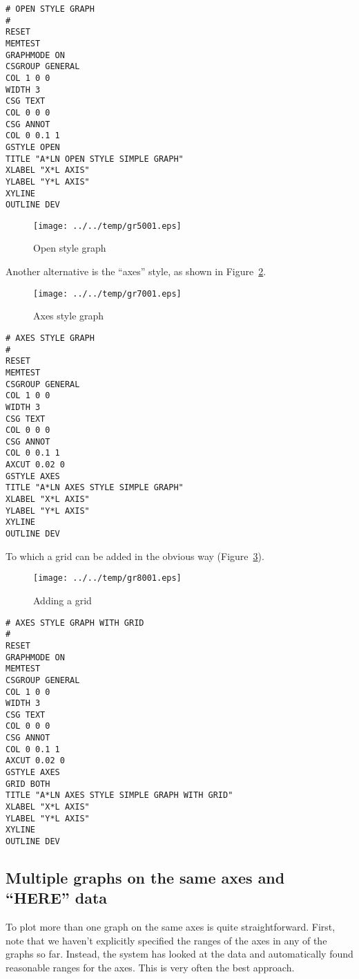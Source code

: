 \documentclass[a4paper,twoside,11pt]{article}
\makeatletter
\def\maxwidth{%
  \ifdim\Gin@nat@width>\linewidth
    \linewidth
  \else
    \Gin@nat@width
  \fi
}
\newcommand{\newpara}{\par\vspace{4mm}\noindent}
\makeatother
\begin{document}
\begin{lstlisting}
# OPEN STYLE GRAPH
#
RESET
MEMTEST
GRAPHMODE ON
CSGROUP GENERAL
COL 1 0 0
WIDTH 3
CSG TEXT
COL 0 0 0
CSG ANNOT
COL 0 0.1 1
GSTYLE OPEN
TITLE "A*LN OPEN STYLE SIMPLE GRAPH"
XLABEL "X*L AXIS"
YLABEL "Y*L AXIS"
XYLINE
OUTLINE DEV
\end{lstlisting}

\begin{figure}
  \centering
  \texttt{[image: ../../temp/gr5001.eps]}
  \caption{Open style graph}
  \label{fig:gr5001}
\end{figure}

\newpara
Another alternative is the ``axes'' style, as shown in Figure~\ref{fig:gr7001}.

\begin{figure}
  \centering
  \texttt{[image: ../../temp/gr7001.eps]}
  \caption{Axes style graph}
  \label{fig:gr7001}
\end{figure}

\begin{lstlisting}
# AXES STYLE GRAPH
#
RESET
MEMTEST
CSGROUP GENERAL
COL 1 0 0
WIDTH 3
CSG TEXT
COL 0 0 0
CSG ANNOT
COL 0 0.1 1
AXCUT 0.02 0
GSTYLE AXES
TITLE "A*LN AXES STYLE SIMPLE GRAPH"
XLABEL "X*L AXIS"
YLABEL "Y*L AXIS"
XYLINE
OUTLINE DEV
\end{lstlisting}

\newpara
To which a grid can be added in the obvious way (Figure~\ref{fig:gr8001}).

\begin{figure}
  \centering
  \texttt{[image: ../../temp/gr8001.eps]}
  \caption{Adding a grid}
  \label{fig:gr8001}
\end{figure}

\begin{lstlisting}
# AXES STYLE GRAPH WITH GRID
#
RESET
GRAPHMODE ON
MEMTEST
CSGROUP GENERAL
COL 1 0 0
WIDTH 3
CSG TEXT
COL 0 0 0
CSG ANNOT
COL 0 0.1 1
AXCUT 0.02 0
GSTYLE AXES
GRID BOTH
TITLE "A*LN AXES STYLE SIMPLE GRAPH WITH GRID"
XLABEL "X*L AXIS"
YLABEL "Y*L AXIS"
XYLINE
OUTLINE DEV
\end{lstlisting}


\subsection{Multiple graphs on the same axes and ``HERE'' data}\label{multiple-graphs-on-the-same-axes-and-here-data}
\newpara
To plot more than one graph on the same axes is quite straightforward.
First, note that we haven't explicitly specified the ranges of the axes
in any of the graphs so far. Instead, the system has looked at the data
and automatically found reasonable ranges for the axes. This is very
often the best approach.
\end{document}
